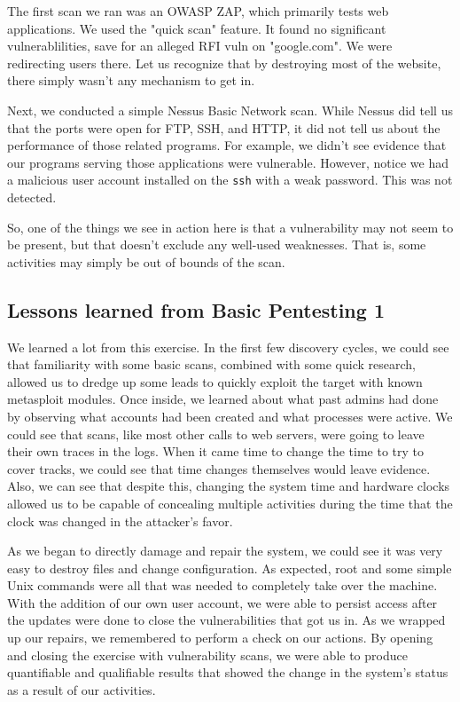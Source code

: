 The first scan we ran was an OWASP ZAP, which primarily tests web applications.  We used the "quick scan" feature.  It found no significant vulnerablilities, save for an alleged RFI vuln on "google.com".  We were redirecting users there.  Let us recognize that by destroying most of the website, there simply wasn't any mechanism to get in.  


Next, we conducted a simple Nessus Basic Network scan.  While Nessus did tell us that the ports were open for FTP, SSH, and HTTP, it did not tell us about the performance of those related programs.  For example, we didn't see evidence that our programs serving those applications were vulnerable.  However, notice we had a malicious user account installed on the \texttt{ssh} with a weak password.  This was not detected.


So, one of the things we see in action here is that a vulnerability may not seem to be present, but that doesn't exclude any well-used weaknesses.  That is, some activities may simply be out of bounds of the scan.

\subsection{Lessons learned from Basic Pentesting 1}

We learned a lot from this exercise.  In the first few discovery cycles, we could see that familiarity with some basic scans, combined with some quick research, allowed us to dredge up some leads to quickly exploit the target with known metasploit modules.  Once inside, we learned about what past admins had done by observing what accounts had been created and what processes were active.  We could see that scans, like most other calls to web servers, were going to leave their own traces in the logs.  When it came time to change the time to try to cover tracks, we could see that time changes themselves would leave evidence.  Also, we can see that despite this, changing the system time and hardware clocks allowed us to be capable of concealing multiple activities during the time that the clock was changed in the attacker's favor.

As we began to directly damage and repair the system, we could see it was very easy to destroy files and change configuration.  As expected, root and some simple Unix commands were all that was needed to completely take over the machine.  With the addition of our own user account, we were able to persist access after the updates were done to close the vulnerabilities that got us in.  As we wrapped up our repairs, we remembered to perform a check on our actions.  By opening and closing the exercise with vulnerability scans, we were able to produce quantifiable and qualifiable results that showed the change in the system's status as a result of our activities.  

